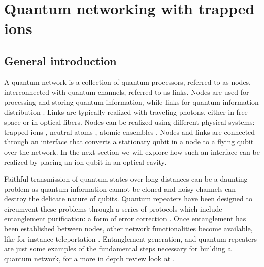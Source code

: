 \section{Quantum networking with trapped ions}
\subsection{General introduction}
A quantum network is a collection of quantum processors, referred to as nodes, interconnected with quantum channels, referred to as links. Nodes are used for processing and storing quantum information, while links for quantum information distribution \cite{kimble}. Links are typically realized with traveling photons, either in free-space \cite{Hughes2002} or in optical fibers. Nodes can be realized using different physical systems: trapped ions \cite{ion_quantumnetwork}, neutral atoms \cite{Ritter2012}, atomic ensembles \cite{kimble}. Nodes and links are connected through an interface that converts a stationary qubit in a node to a flying qubit over the network.  In the next section we will explore how such an interface can be realized by placing an ion-qubit in an optical cavity.\par
Faithful transmission of quantum states over long distances can be a daunting problem as quantum information cannot be cloned \cite{nocloning} and noisy channels can destroy the delicate nature of qubits. Quantum repeaters have been designed \cite{quantumrepeters} to circumvent these problems through a series of protocols which include entanglement purification: a form of error correction \cite{Pan2001}. Once entanglement has been established between nodes, other network functionalities become available, like for instance teleportation \cite{PhysRevLett.70.1895}. Entanglement generation, and quantum repeaters are just some examples of the fundamental steps necessary for building a quantum network, for a more in depth review look at \cite{Wehnereaam9288}.


